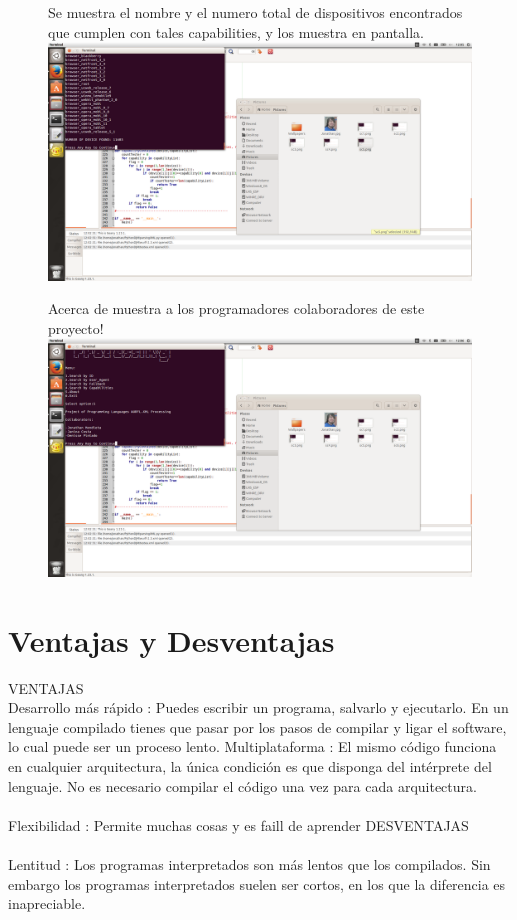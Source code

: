 \documentclass[14pt]{article} %
\begin{document}
\begin{figure}
Se muestra el nombre y el numero total de dispositivos encontrados que cumplen con tales capabilities, y los muestra en pantalla.
\centering
\includegraphics[scale=0.22]{imagenes/sc6.png}
\end{figure}

\begin{figure}
Acerca de muestra a los programadores colaboradores de este proyecto!
\centering
\includegraphics[scale=0.22]{imagenes/sc7.png}
\end{figure}


\section{Ventajas y Desventajas}
VENTAJAS\\
Desarrollo más rápido : Puedes escribir un programa, salvarlo y ejecutarlo. En un lenguaje compilado tienes que pasar por los pasos de compilar y ligar el software, lo cual puede ser un proceso lento.
Multiplataforma : El mismo código funciona en cualquier arquitectura, la única condición es que disponga del intérprete del lenguaje. No es necesario compilar el código una vez para cada arquitectura.\\\\
Flexibilidad : Permite muchas cosas y es faill de aprender
\newline
DESVENTAJAS\\\\
Lentitud : Los programas interpretados son más lentos que los compilados. Sin embargo los programas interpretados suelen ser cortos, en los que la diferencia es inapreciable.
\end{document}
